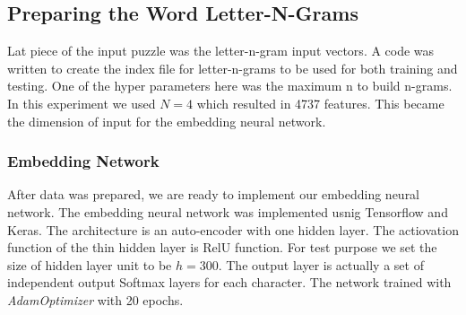 \subsection{Preparing the Word Letter-N-Grams}
Lat piece of the input puzzle was the letter-n-gram input vectors. A code was written to create the index file for letter-n-grams to be used for both training and testing. One of the hyper parameters here was the maximum n to build n-grams. In this experiment we used  $N = 4$ which resulted in 4737 features. This became the dimension of input for the embedding neural network. 
\subsubsection{Embedding Network}

After data was prepared, we are ready to implement our embedding neural network. The embedding neural network was implemented usnig Tensorflow and Keras. The architecture is an auto-encoder with one hidden layer. The actiovation function of the thin hidden layer is RelU function. For test purpose we set the size of hidden layer unit to be $h = 300$.  The output layer is actually a set of independent output Softmax layers for each character. The network trained with \textit{AdamOptimizer} with 20 epochs. 



